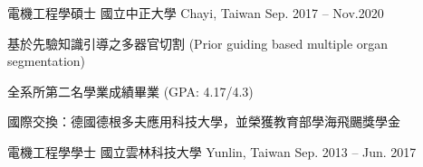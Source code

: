 

\begin{cventries}

  \cventry
    {電機工程學碩士} %
    {國立中正大學} %
    {Chayi, Taiwan} %
    {Sep. 2017 – Nov.2020} %
    {
    \begin{cvitems}
      \item 基於先驗知識引導之多器官切割 (Prior guiding based multiple organ segmentation)
      \item 全系所第二名學業成績畢業 (GPA: 4.17/4.3)
      \item 國際交換：德國德根多夫應用科技大學，並榮獲教育部學海飛颺獎學金
    \end{cvitems}
    }

  \cventry
    {電機工程學學士} %
    {國立雲林科技大學} %
    {Yunlin, Taiwan} %
    {Sep. 2013 – Jun. 2017} %
    {}

\end{cventries}
